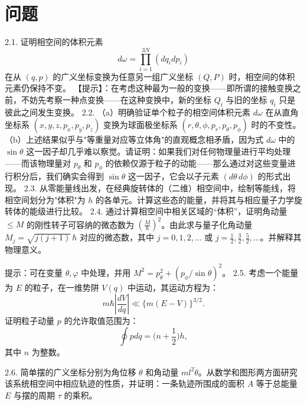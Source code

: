 \section{问题}\label{ux95eeux9898_chap2}
2.1. 证明相空间的体积元素
\begin{equation}\tag{2.3.30}\label{eq:2.3.30}
d \omega = \prod _ { i = 1 } ^{3 N} ( d q _ { i } d p _ { i } )
\end{equation}
在从 \((q,p)\) 的广义坐标变换为任意另一组广义坐标 \((Q,P)\) 时，相空间的体积元素仍保持不变。
【提示】：在考虑这种最为一般的变换——即所谓的接触变换之前，不妨先考察一种点变换——在这种变换中，新的坐标 \(Q_i\) 与旧的坐标 \(q_i\) 只是彼此之间发生变换。
2.2. （a）明确验证单个粒子的相空间体积元素 \(d\omega\) 在从直角坐标系 \((x,y,z,p_x,p_y,p_z)\) 变换为球面极坐标系 \((r,\theta,\phi,p_r,p_\theta,p_\phi)\) 时的不变性。
（b）上述结果似乎与"等重量对应等立体角"的直观概念相矛盾，因为式 \(d\omega\) 中的 \(\sin\theta\) 这一因子却几乎难以察觉。请证明：如果我们对任何物理量进行平均处理——而该物理量对 \(p_\theta\) 和 \(p_\phi\) 的依赖仅源于粒子的动能——那么通过对这些变量进行积分后，我们确实会得到 \(\sin\theta\) 这一因子，它会以子元素 \((d\theta\,d\phi)\) 的形式出现。
2.3. 从零能量线出发，在经典旋转体的（二维）相空间中，绘制等能线，将相空间划分为"体积"为 \(h\) 的各单元。计算这些态的能量，并将其与相应量子力学旋转体的能级进行比较。
2.4. 通过计算相空间中相关区域的“体积”，证明角动量 \(\le M\) 的刚性转子可容纳的微态数为 \(\left(\frac{M}{\hbar}\right)^2\)。由此求与量子化角动量 \(M_j=\sqrt{j(j+1)}\,\hbar\) 对应的微态数，其中 \(j=0,1,2,\ldots\) 或 \(j=\frac{1}{2},\frac{3}{2},\frac{5}{2},\ldots\)。并解释其物理意义。

提示：可在变量 \(\theta,\varphi\) 中处理，并用 \(M^{2}=p_{\theta}^{2}+(p_{\phi}/\sin\theta)^{2}\)。
2.5. 考虑一个能量为 \(E\) 的粒子，在一维势阱 \(V(q)\) 中运动，其运动方程为：
\begin{equation}\tag{2.3.31}\label{eq:2.3.31}
m \hbar \left| \frac { d V } { d q } \right| \ll \{ m ( E - V ) \} ^{3 / 2} .
\end{equation}
证明粒子动量 \(p\) 的允许取值范围为：
\begin{equation}\tag{2.3.32}\label{eq:2.3.32}
\oint p d q = \Big ( n + { \frac { 1 } { 2 } } \Big ) h ,
\end{equation}
其中 \(n\) 为整数。

2.6. 简单摆的广义坐标分别为角位移 \(\theta\) 和角动量 \(m l^{2} \dot{\theta}\)。从数学和图形两方面研究该系统相空间中相应轨迹的性质，并证明：一条轨迹所围成的面积 \(A\) 等于总能量 \(E\) 与摆的周期 \(\tau\) 的乘积。

